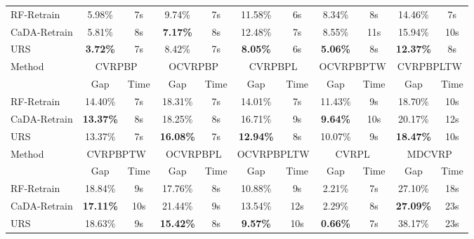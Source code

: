 \documentclass{article}
\theoremstyle{plain}
\theoremstyle{definition}
\theoremstyle{remark}
\begin{document}
\begin{table}[htbp]
{\begin{tabular}{l|cc|cc|cc|cc|cc}
    \midrule
    RF-Retrain & 5.98\% & 7s    & 9.74\% & 7s    & 11.58\% & 6s    & 8.34\% & 8s    & 14.46\% & 7s \\
    CaDA-Retrain & 5.81\% & 8s    & \cellcolor[HTML]{D0CECE}\textbf{7.17\%} & 8s    & 12.48\% & 7s    & 8.55\% & 11s   & 15.94\% & 10s \\
    URS & \cellcolor[HTML]{D0CECE}\textbf{3.72\%} & 7s    & 8.42\% & 7s    & \cellcolor[HTML]{D0CECE}\textbf{8.05\%} & 6s    & \cellcolor[HTML]{D0CECE}\textbf{5.06\%} & 8s    & \cellcolor[HTML]{D0CECE}\textbf{12.37\%} & 8s \\
    \midrule
    \midrule
    \multirow{2}[2]{*}{Method} & \multicolumn{2}{c|}{CVRPBP} & \multicolumn{2}{c|}{OCVRPBP} & \multicolumn{2}{c|}{CVRPBPL} & \multicolumn{2}{c|}{OCVRPBPTW} & \multicolumn{2}{c}{CVRPBPLTW} \\
          & Gap   & Time  & Gap   & Time  & Gap   & Time  & Gap   & Time  & Gap   & Time \\
    \midrule
    RF-Retrain & 14.40\% & 7s    & 18.31\% & 7s    & 14.01\% & 7s    & 11.43\% & 9s    & 18.70\% & 10s \\
    CaDA-Retrain & \cellcolor[HTML]{D0CECE}\textbf{13.37\%} & 8s    & 18.25\% & 8s    & 16.71\% & 9s    & \cellcolor[HTML]{D0CECE}\textbf{9.64\%} & 10s   & 20.17\% & 12s \\
    URS & 13.37\% & 7s    & \cellcolor[HTML]{D0CECE}\textbf{16.08\%} & 7s    & \cellcolor[HTML]{D0CECE}\textbf{12.94\%} & 8s    & 10.07\% & 9s    & \cellcolor[HTML]{D0CECE}\textbf{18.47\%} & 10s \\
    \midrule
    \midrule
    \multirow{2}[2]{*}{Method} & \multicolumn{2}{c|}{CVRPBPTW} & \multicolumn{2}{c|}{OCVRPBPL} & \multicolumn{2}{c|}{OCVRPBPLTW} & \multicolumn{2}{c|}{CVRPL} & \multicolumn{2}{c}{MDCVRP} \\
          & Gap   & Time  & Gap   & Time  & Gap   & Time  & Gap   & Time  & Gap   & Time \\
    \midrule
    RF-Retrain & 18.84\% & 9s    & 17.76\% & 8s    & 10.88\% & 9s    & 2.21\% & 7s    & 27.10\% & 18s \\
    CaDA-Retrain & \cellcolor[HTML]{D0CECE}\textbf{17.11\%} & 10s   & 21.44\% & 9s    & 13.54\% & 12s   & 2.29\% & 8s    & \cellcolor[HTML]{D0CECE}\textbf{27.09\%} & 23s \\
    URS & 18.63\% & 9s    & \cellcolor[HTML]{D0CECE}\textbf{15.42\%} & 8s    & \cellcolor[HTML]{D0CECE}\textbf{9.57\%} & 10s   & \cellcolor[HTML]{D0CECE}\textbf{0.66\%} & 7s    & 38.17\% & 23s \\
    \midrule

\end{tabular}}
\end{table}
\end{document}
